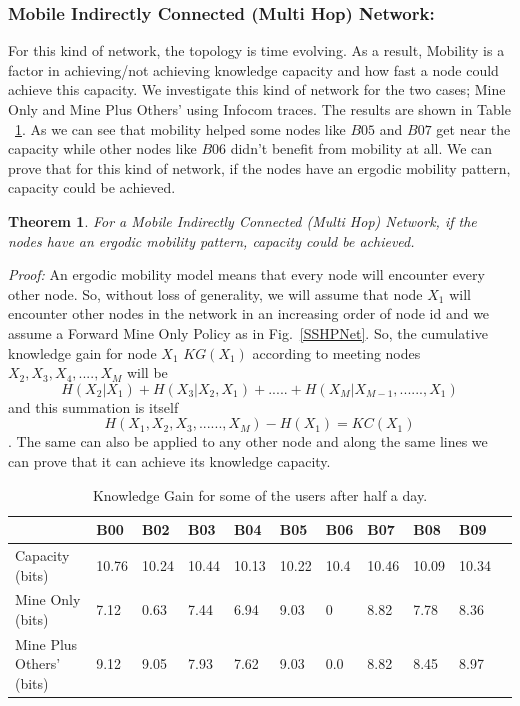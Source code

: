 \documentclass[11pt]{article}
\newtheorem{theorem}{Theorem}
\begin{document}
\subsubsection{ Mobile Indirectly Connected (Multi Hop) Network:}
For this kind of network, the topology is time evolving. As a result, Mobility is a factor in achieving/not achieving knowledge capacity and how fast a node could achieve this capacity. We investigate this kind of network for the two cases; Mine Only and Mine Plus Others' using Infocom traces. The results are shown in Table ~\ref{tab:Infocom}. As we can see that mobility helped some nodes like $B05$ and $B07$ get near the capacity while other nodes like $B06$ didn't benefit from mobility at all.
We can prove that for this kind of network, if the nodes have an ergodic mobility pattern, capacity could be achieved.\\
\begin{theorem}
For a Mobile Indirectly Connected (Multi Hop) Network, if the nodes have an ergodic mobility pattern, capacity could be achieved.
\end{theorem}
\textit{Proof:}
An ergodic mobility model means that every node will encounter every other node. So, without loss of generality, we will assume that node $X_1$ will encounter other nodes in the network in an increasing order of node id and we assume a Forward Mine Only Policy as in Fig.~\ref{SSHPNet}. So, the cumulative knowledge gain for node $X_1$ $KG(X_1)$ according to meeting nodes $X_2, X_3, X_4,...., X_M$ will be $$H(X_2|X_1) + H(X_3|X_2,X_1) + .....+ H(X_M|X_{M-1}, ......, X_1)$$ and this summation is itself $$H(X_1, X_2, X_3, ......, X_M) - H(X_1)= KC(X_1)$$. The same can also be applied to any other node and along the same lines we can prove that it can achieve its knowledge capacity.\\





\begin{table}
\centering
\caption{Knowledge Gain for some of the users after half a day.}{} \label{tab:Infocom} 
\begin{tabular}[!tp]{|l|l|l|l|l|l|l|l|l|l|l|}
\hline
       &B00& B02 & B03 & B04 & B05 & B06 & B07 & B08 & B09\\
     

\hline
Capacity (bits) &  10.76& 10.24 & 10.44 &  10.13   & 10.22   &  10.4  &  10.46  & 10.09 &  10.34 \\
\hline



Mine Only (bits)  &7.12  & 0.63& 7.44 &6.94& 9.03 & 0 & 8.82 &7.78 &8.36 \\
\hline
Mine Plus Others' (bits) & 9.12 &9.05	&	7.93&	7.62&	9.03	&0.0	&8.82	&			8.45	&		    8.97\\
     

\hline
\end{tabular}
\end{table}



\end{document}
